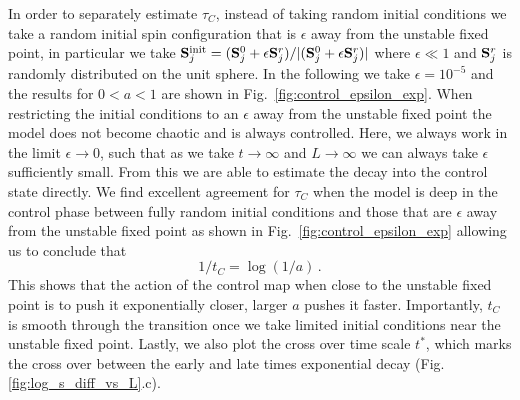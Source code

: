 \documentclass[twocolumn,amsmath,amssymb,floatfix,superscriptaddress,aps,prl]{revtex4-2}
\begin{document}
{In order to separately estimate $\tau_C$, instead of taking random initial conditions we take a random initial spin configuration that is $\epsilon$ away from the unstable fixed point, in particular we take
${\bf S}_j^{\mathrm{init}}=({\bf S}_j^0+\epsilon {\bf S}_j^r)/|({\bf S}_j^0+\epsilon {\bf S}_j^r)|$ 
where  
$\epsilon \ll 1$ and ${\bf S}_j^r$ is randomly distributed on the unit sphere. In the following we take $\epsilon = 10^{-5}$ and the results for $0<a<1$ are shown in Fig.~\ref{fig:control_epsilon_exp}. When restricting the initial conditions to an $\epsilon$ away from the unstable fixed point the model does not become chaotic and is always controlled. Here, we always work in the limit $\epsilon \rightarrow 0$, such that as we take $t\rightarrow \infty$ and $L\rightarrow \infty$ we can always take $\epsilon$ sufficiently small. From this we are able to estimate the decay into the control state directly. We  find excellent agreement for $\tau_C$ when the model is  deep in the control phase between fully random initial conditions   and those that are $\epsilon$ away from the unstable fixed point as shown in Fig.~\ref{fig:control_epsilon_exp} allowing us to conclude that
\begin{equation}
    1/t_C=\log(1/a)\,. 
\end{equation}
This shows that the action of the control map when close to the unstable fixed point is to push it exponentially closer, larger $a$ pushes it faster. Importantly, $t_C$ is smooth through the transition once we take limited initial conditions near the unstable fixed point. Lastly, we also plot the cross over time scale $t^*$, which marks the cross over between the early and late times exponential decay (Fig.\ref{fig:log_s_diff_vs_L}.c).

}
\end{document}
